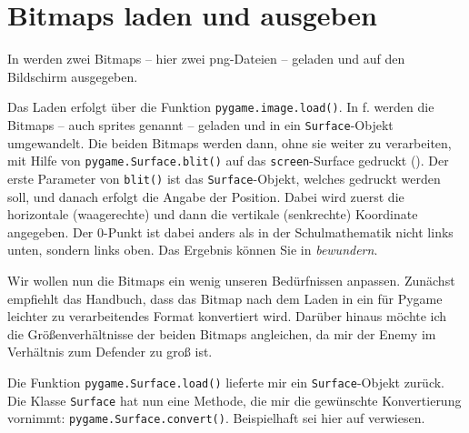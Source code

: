 \newpage
\section{Bitmaps laden und ausgeben}\label{secBitmapLaden}


In  werden zwei Bitmaps -- hier zwei \Gls{png}-Dateien -- geladen und auf den Bildschirm ausgegeben. 

Das Laden erfolgt über die Funktion \texttt{pygame.image.load()}. In f. werden die Bitmaps -- auch \glspl{sprite} genannt -- geladen und in ein \texttt{Surface}-Objekt umgewandelt. Die beiden Bitmaps werden dann, ohne sie weiter zu verarbeiten, mit Hilfe von \texttt{pygame.Sur\-face.\-blit()} auf das \texttt{screen}-Surface gedruckt (). Der erste Parameter von \texttt{blit()} ist das \texttt{Surface}-Objekt, welches gedruckt werden soll, und danach erfolgt die Angabe der Position. Dabei wird zuerst die horizontale (waagerechte) und dann die vertikale (senkrechte) Koordinate angegeben. Der 0-Punkt ist dabei anders als in der Schulmathematik nicht links unten, sondern links oben. Das Ergebnis können Sie in  \emph{bewundern}.


Wir wollen nun die Bitmaps ein wenig unseren Bedürfnissen anpassen. Zunächst empfiehlt das Handbuch, dass das Bitmap nach dem Laden in ein für Pygame leichter zu verarbeitendes Format konvertiert wird. Darüber hinaus möchte ich die Größenverhältnisse der beiden Bitmaps angleichen, da mir der Enemy im Verhältnis zum Defender zu groß ist. 


\begin{figure}%
    \vspace{-1em}%
\end{figure}%
Die Funktion \texttt{pygame.Surface.load()} lieferte mir ein \texttt{Surface}-Objekt zurück. Die Klasse \texttt{Surface} hat nun eine Methode, die mir die gewünschte Konvertierung vornimmt: \texttt{pygame.Surface.convert()}.\label{pageTransparenz} Beispielhaft sei hier auf  verwiesen. 

